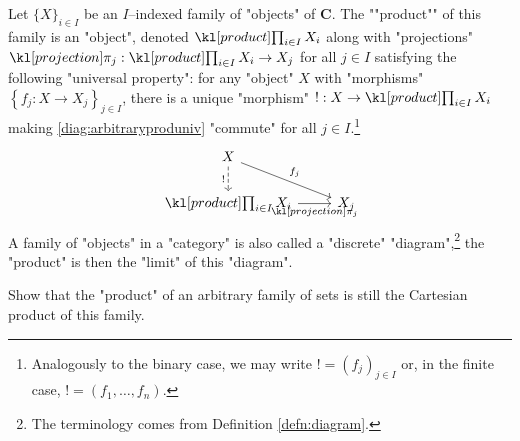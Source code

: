 \documentclass[main.tex]{subfiles}
\begin{document}
\begin{defn}[Product]
    \AP Let $\{X\}_{i \in I}$ be an $I$--indexed family of "objects" of $\mathbf{C}$. The ""product"" of this family is an "object", denoted $\Product_{i \in I} X_i$ along with "projections" $\projection_j: \Product_{i \in I} X_i \rightarrow X_j$ for all $j \in I$ satisfying the following "universal property": for any "object" $X$ with "morphisms" $\left\{ f_j: X\rightarrow X_j\right\}_{j \in I}$, there is a unique "morphism" $!: X \rightarrow \Product_{i \in I} X_i$ making \eqref{diag:arbitraryproduniv} "commute" for all $j \in I$.\footnote{Analogously to the binary case, we may write $! = (f_j)_{j\in I}$ or, in the finite case, $! = (f_1, \dots, f_n)$.}
    \begin{equation}\label{diag:arbitraryproduniv}
        \begin{tikzcd}
        X \arrow[d, "!"', dashed] \arrow[rd, "f_j"] &     \\
        \Product_{i \in I}X_i \arrow[r, "\projection_j"']     & X_j
        \end{tikzcd}
    \end{equation}
    A family of "objects" in a "category" is also called a "discrete" "diagram",\footnote{The terminology comes from Definition \ref{defn:diagram}.} the "product" is then the "limit" of this "diagram".
\end{defn}
\begin{exer}
    Show that the "product" of an arbitrary family of sets is still the Cartesian product of this family.
\end{exer}
\end{document}
